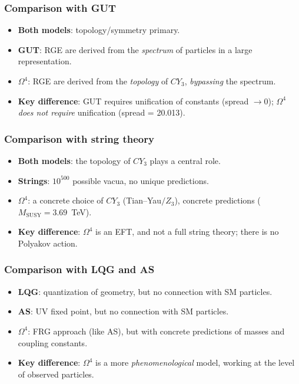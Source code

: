 \documentclass[11pt,a4paper]{article}
\newcommand{\CY}{\ensuremath{CY_3}}
\newcommand{\Om}{\ensuremath{\Omega^4}}
\theoremstyle{definition}
\begin{document}
\subsubsection{Comparison with GUT}

\begin{itemize}
    \item \textbf{Both models}: topology/symmetry primary.
    \item \textbf{GUT}: RGE are derived from the \emph{spectrum} of
          particles in a large representation.
    \item \textbf{$\Om$}: RGE are derived from the \emph{topology}
          of $\CY$, \emph{bypassing} the spectrum.
    \item \textbf{Key difference}: GUT requires unification
          of constants (spread $\to 0$); $\Om$ \emph{does not require}
          unification (spread = 20.013).
\end{itemize}

\subsubsection{Comparison with string theory}

\begin{itemize}
    \item \textbf{Both models}: the topology of $\CY$ plays
          a central role.
    \item \textbf{Strings}: $10^{500}$ possible vacua,
          no unique predictions.
    \item \textbf{$\Om$}: a concrete choice of $\CY$ (Tian--Yau$/Z_3$),
          concrete predictions ($M_{\text{SUSY}} = 3.69$~TeV).
    \item \textbf{Key difference}: $\Om$ is an EFT, and not a full
          string theory; there is no Polyakov action.
\end{itemize}

\subsubsection{Comparison with LQG and AS}

\begin{itemize}
    \item \textbf{LQG}: quantization of geometry, but no connection
          with SM particles.
    \item \textbf{AS}: UV fixed point, but no connection
          with SM particles.
    \item \textbf{$\Om$}: FRG approach (like AS), but with concrete
          predictions of masses and coupling constants.
    \item \textbf{Key difference}: $\Om$ is a more
          \emph{phenomenological} model, working
          at the level of observed particles.
\end{itemize}
\end{document}
